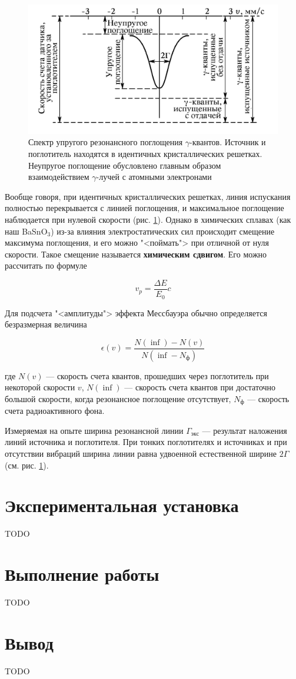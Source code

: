 \documentclass[12pt]{kiarticle}
\begin{document}
		\begin{figure}[h!]
		\centering
			\includegraphics[width=0.7\linewidth]{spektr}
		\caption{Спектр упругого резонансного поглощения $ \gamma $-квантов. Источник и поглотитель находятся в идентичных кристаллических решетках. Неупругое поглощение
			обусловлено главным образом взаимодействием $ \gamma $-лучей с атомными электронами}
		\label{ris 2}
	\end{figure}
	
	Вообще говоря, при идентичных кристаллических решетках, линия испускания полностью перекрывается с линией поглощения, и максимальное поглощение
	наблюдается при нулевой скорости (рис. \ref{ris 2}). Однако в химических сплавах (как наш BaSnO$_3$) из-за влияния электростатических сил происходит смещение максимума поглощения, и его можно "<поймать"> при отличной от нуля скорости. Такое смещение называется \textbf{химическим сдвигом}. Его можно рассчитать по формуле 
	
	\begin{equation}\label{}
	v_p = \dfrac{\Delta E}{E_0}c
	\end{equation}
	
	Для подсчета "<амплитуды"> эффекта Мессбауэра обычно определяется безразмерная величина
	
	\begin{equation}\label{}
	\epsilon(v) = \dfrac{N (\inf) - N(v)}{N (\inf - N_ф)}
	\end{equation}
	
	где $ N(v) $ --- скорость счета квантов, прошедших через поглотитель при
	некоторой скорости $ v $, $ N (\inf) $ --- скорость счета квантов при достаточно
	большой скорости, когда резонансное поглощение отсутствует, $ N_ф  $ --- скорость счета радиоактивного фона.
	
	Измеряемая на опыте ширина резонансной линии $  \Gamma_{экс} $ --- результат наложения линий источника и поглотителя. При тонких поглотителях и источниках и при отсутствии вибраций ширина линии равна удвоенной естественной ширине $ 2\Gamma $ (см. рис. \ref{ris 2}).
	
	\section{Экспериментальная установка}
	
	TODO
	
	\section{Выполнение работы}
	
	TODO
	
	\section{Вывод}
	
	TODO
	
\end{document}
